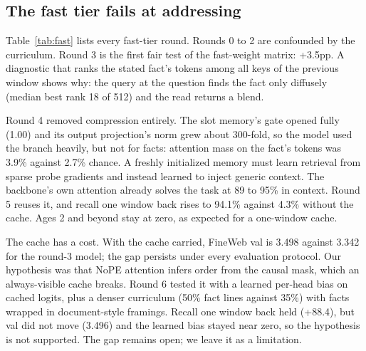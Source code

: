 \documentclass[11pt]{article}
\begin{document}
\subsection{The fast tier fails at addressing}
\label{sec:results-fast}
Table~\ref{tab:fast} lists every fast-tier round. Rounds 0 to 2 are confounded
by the curriculum. Round 3 is the first fair test of the fast-weight matrix:
+3.5pp. A diagnostic that ranks the stated fact's tokens among all keys of the
previous window shows why: the query at the question finds the fact only
diffusely (median best rank 18 of 512) and the read returns a blend.

Round 4 removed compression entirely. The slot memory's gate opened fully (1.00)
and its output projection's norm grew about 300-fold, so the model used
the branch heavily, but not for facts: attention mass on the fact's tokens was
3.9\% against 2.7\% chance. A freshly initialized memory must learn retrieval
from sparse probe gradients and instead learned to inject generic context. The
backbone's own attention already solves the task at 89 to 95\% in context.
Round 5 reuses it, and recall one window back rises to 94.1\% against 4.3\%
without the cache. Ages 2 and beyond stay at zero, as expected for a one-window
cache.

The cache has a cost. With the cache carried, FineWeb val is 3.498 against
3.342 for the round-3 model; the gap persists under every evaluation protocol.
Our hypothesis was that NoPE attention infers order from the causal mask, which
an always-visible cache breaks. Round 6 tested it with a learned per-head bias
on cached logits, plus a denser curriculum (50\% fact lines against 35\%) with
facts wrapped in document-style framings. Recall one window back held (+88.4),
but val did not move (3.496) and the learned bias stayed near zero, so the
hypothesis is not supported. The gap remains open; we leave it as a
limitation.
\end{document}
